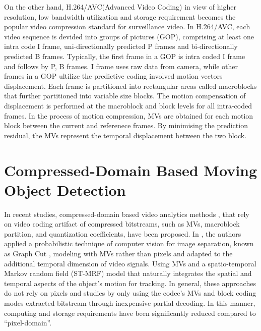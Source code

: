 On the other hand, H.264/AVC(Advanced Video Coding) in view of higher resolution, low bandwidth utilization and storage requirement becomes the popular video compression standard for surveillance video. In H.264/AVC, each video sequence is devided into groups of pictures (GOP), comprising at least one intra code I frame, uni-directionally predicted P frames and bi-directionally predicted B frames. Typically, the first frame in a GOP is intra coded I frame and follows by P, B frames. I frame uses raw data from camera, while other frames in a GOP ultilize the predictive coding involved motion vectors displacement. Each frame is partitioned into rectangular areas called macroblocks that further partitioned into variable size blocks. The motion compensation of displacement is performed at the macroblock and block levels for all intra-coded frames. In the process of motion compression, MVs are obtained for each motion block between the current and referenece frames. By minimising the prediction residual, the MVs represent the temporal displacement between the two block. \\
\section{Compressed-Domain Based Moving Object Detection}




In recent studies, compressed-domain based video analytics methods  \cite{bombardelli2018efficient},\cite{khatoonabadi2012video} that rely on video coding artifact of compressed bitstreams, such as MVs, macroblock partition, and quantization coefficients, have been proposed. In \cite{bombardelli2018efficient}, the authors applied a probabilistic technique of computer vision for image separation, known as Graph Cut \cite{boykov2001fast}, modeling with MVs rather than pixels and adapted to the additional temporal dimension of video signals. Using MVs and a spatio-temporal Markov random field (ST-MRF) model that naturally integrates the spatial and temporal aspects of the object’s motion for tracking. In general, these approaches do not rely on pixels and studies by only using the codec’s MVs and block coding modes extracted bitstream through inexpensive partial decoding. In this manner, computing and storage requirements have been significantly reduced compared to “pixel-domain”.\\

